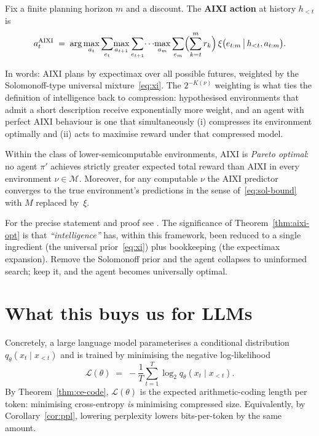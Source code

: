 \begin{definition}[AIXI]
\label{def:aixi}
Fix a finite planning horizon $m$ and a discount. The \textbf{AIXI
action} at history $h_{<t}$ is
\begin{equation}
  a_t^{\text{AIXI}}
  \;=\; \arg\max_{a_t}
        \sum_{e_t}\!\max_{a_{t+1}}\sum_{e_{t+1}}\!\cdots\!\max_{a_m}\sum_{e_m}
        \Bigl(\sum_{k=t}^{m} r_k\Bigr)\,
        \xi\bigl(e_{t:m} \,\big|\, h_{<t}, a_{t:m}\bigr). \label{eq:aixi-rule}
\end{equation}
\end{definition}

In words: AIXI plans by expectimax over all possible futures, weighted
by the Solomonoff-type universal mixture~\eqref{eq:xi}. The
$2^{-K(\nu)}$ weighting is what ties the definition of intelligence
back to compression: hypothesised environments that admit a short
description receive exponentially more weight, and an agent with
perfect AIXI behaviour is one that simultaneously (i) compresses its
environment optimally and (ii) acts to maximise reward under that
compressed model.

\begin{theorem}
\label{thm:aixi-opt}
Within the class of lower-semicomputable environments, AIXI is
\emph{Pareto optimal}: no agent $\pi'$ achieves strictly greater
expected total reward than AIXI in every environment
$\nu \in \mathcal{M}$. Moreover, for any computable $\nu$ the AIXI
predictor converges to the true environment's predictions in the
sense of~\eqref{eq:sol-bound} with $M$ replaced by~$\xi$.
\end{theorem}

For the precise statement and proof see \citet[Ch.\ 5]{hutter2005universal}.
The significance of Theorem~\ref{thm:aixi-opt} is that
\emph{``intelligence''} has, within this framework, been reduced to a
single ingredient (the universal prior~\eqref{eq:xi}) plus bookkeeping
(the expectimax expansion). Remove the Solomonoff prior and the agent
collapses to uninformed search; keep it, and the agent becomes
universally optimal.

\section{What this buys us for LLMs}
\label{sec:llms}

Concretely, a large language model parameterises a conditional
distribution $q_\theta(x_t \mid x_{<t})$ and is trained by minimising
the negative log-likelihood
\begin{equation}
  \mathcal{L}(\theta)
  \;=\; -\frac{1}{T}\sum_{t=1}^{T} \log_2 q_\theta(x_t \mid x_{<t}). \label{eq:llm-loss}
\end{equation}
By Theorem~\ref{thm:ce-code}, $\mathcal{L}(\theta)$ is the expected
arithmetic-coding length per token: minimising cross-entropy
\emph{is} minimising compressed size. Equivalently, by
Corollary~\ref{cor:ppl}, lowering perplexity lowers bits-per-token by
the same amount.

